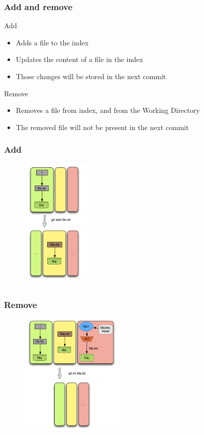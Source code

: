\documentclass{beamer}
\begin{document}
\begin{frame}
	\frametitle{Add and remove}

	\begin{block}{Add}
	\begin{itemize}
		\item Adds a file to the index
		\item Updates the content of a file in the index
		\item Those changes will be stored in the next commit
	\end{itemize}
	\end{block}

	\begin{block}{Remove}
	\begin{itemize}
		\item Removes a file from index, and from the
		Working Directory
		\item The removed file will not be present in the next commit
	\end{itemize}
	\end{block}

\end{frame}

\begin{frame}[fragile]
   \frametitle{Add}
   \begin{figure}
      \centering
      \includegraphics[width=0.3\textwidth]{images/add1.png}
   \end{figure}
\end{frame}

\begin{frame}[fragile]
   \frametitle{Remove}
   \begin{figure}
      \centering
      \includegraphics[width=0.45\textwidth]{images/remove1.png}
   \end{figure}
\end{frame}
\end{document}
